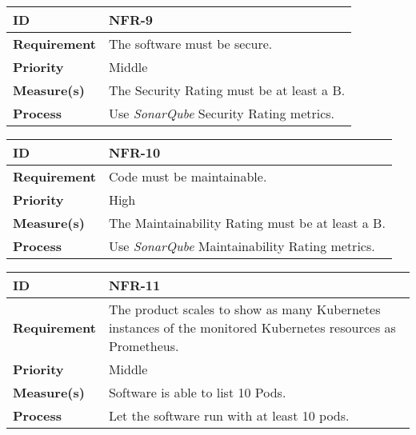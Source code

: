 \begin{center}
\begin{tabular}{ | m{8em} | m{25em}| } 
 \hline
 \textbf{ID} & NFR-9\\ 
 \hline
 \textbf{Requirement} & The software must be secure. \\
 \hline
 \textbf{Priority} & Middle \\
 \hline
 \textbf{Measure(s)} & The Security Rating must be at least a B. \\
 \hline
 \textbf{Process} & Use \textit{SonarQube} Security Rating metrics. \\
 \hline
\end{tabular}
\end{center}

\begin{center}
\begin{tabular}{ | m{8em} | m{25em}| } 
 \hline
 \textbf{ID} & NFR-10\\ 
 \hline
 \textbf{Requirement} & Code must be maintainable. \\
 \hline
 \textbf{Priority} & High \\
 \hline
 \textbf{Measure(s)} & The Maintainability Rating must be at least a B.\\
 \hline
 \textbf{Process} & Use \textit{SonarQube} Maintainability Rating metrics. \\
 \hline
\end{tabular}
\end{center}


\begin{center}
\begin{tabular}{ | m{8em} | m{25em}| } 
 \hline
 \textbf{ID} & NFR-11\\ 
 \hline
 \textbf{Requirement} & The product scales to show as many Kubernetes instances of the monitored Kubernetes resources as Prometheus. \\
 \hline
 \textbf{Priority} & Middle\\
 \hline
 \textbf{Measure(s)} & Software is able to list 10 Pods. \\
 \hline
 \textbf{Process} & Let the software run with at least 10 pods.\\
 \hline
\end{tabular}
\end{center}
